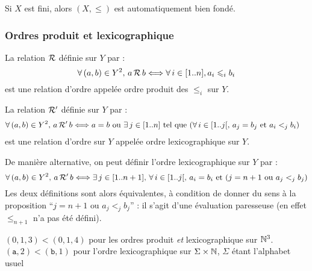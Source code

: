 			\begin{Remarque} Si \(X\) est fini, alors \((X,\leqslant)\) est automatiquement bien fondé.
			\end{Remarque}
			
			
		\subsubsection{Ordres produit et lexicographique}
		
			
			\eqskip{2mm}
			\begin{Definition}
				La relation \(\cal{R}\) définie sur \(Y\) par :
					\[
						\forall \,(a,b) \in Y^2, \,a \,\cal{R}\, b \iff \forall \,i \in [1..n], a_i \leqslant_i b_i
					\]
				est une relation d'ordre appelée ordre produit des \(\leqslant_i\) sur \(Y\).
			\end{Definition}
			
			\begin{Definition}
				La relation \(\cal{R}'\) définie sur \(Y\) par :
				\begin{align*}
					\forall \,(a,b) \in Y^2, \,a \,\cal{R}'\, b & \iff a=b \text{ ou } \exists \, j \in [1..n] \text{ tel que } (\forall \,i \in [1..j[, \,a_j = b_j \text{ et } a_i <_j b_i)
				\end{align*}
				est une relation d'ordre sur \(Y\) appelée ordre lexicographique sur \(Y\).
			\end{Definition}
			\begin{Remarque}
				De manière alternative, on peut définir l'ordre lexicographique sur \(Y\) par :
				\[
					\forall \,(a,b) \in Y^2, \,a \,\cal{R}'\, b \iff \exists \,j \in [1..n+1], \, \forall \,i \in [1..j[, \,a_i = b_i \text{ et } (j = n+1 \text{ ou } a_j <_j b_j)
				\]
				Les deux définitions sont alors équivalentes, à condition de donner du sens à la proposition ``\(j = n+1 \text{ ou } a_j <_j b_j\)'' : il s'agit d'une évaluation paresseuse (en effet \(\leqslant_{n+1}\) n'a pas été défini).
			\end{Remarque}
			\begin{Exemple}
				\bdot \((0,1,3) < (0,1,4)\) pour les ordres produit \emph{et} lexicographique sur \(\bb{N}^3\). \\
				\hspace*{21.2mm} \bdot \((\texttt{a},2) < (\texttt{b},1)\) pour l'ordre lexicographique sur \(\Sigma \times \bb{N}\), \(\Sigma\) étant l'alphabet usuel
			\end{Exemple}
			
